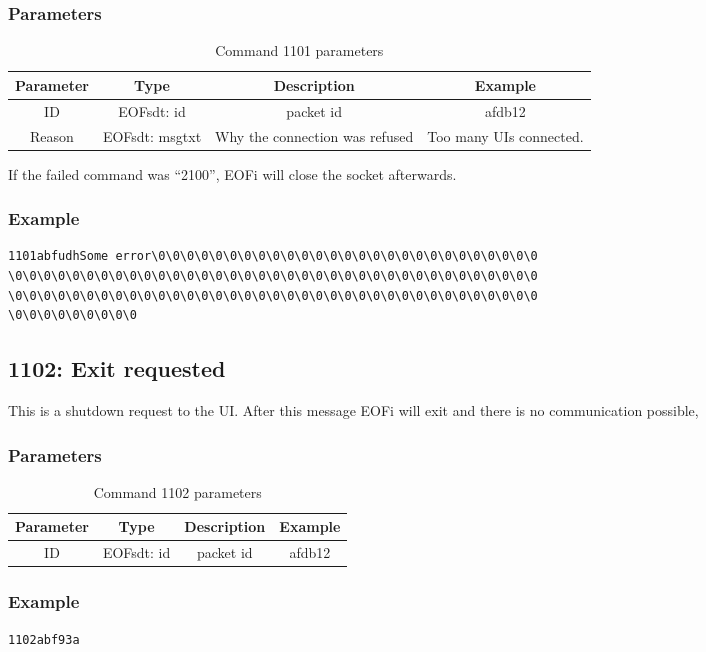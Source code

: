 \documentclass[12pt,a4paper]{book}
\begin{document}
\subsubsection{Parameters}
\begin{longtable}{|c|c|c|c|}
\caption{Command 1101 parameters}\\
\hline
\textbf{Parameter} & \textbf{Type} & \textbf{Description} & \textbf{Example}\\
\hline
ID & EOFsdt: id & packet id & afdb12\\
\hline
Reason & EOFsdt: msgtxt & Why the connection was refused & Too many UIs connected.\\
\hline
\end{longtable}
If the failed command was "`2100"', EOFi will close the socket afterwards.
\subsubsection{Example}
\begin{verbatim}
1101abfudhSome error\0\0\0\0\0\0\0\0\0\0\0\0\0\0\0\0\0\0\0\0\0\0\0\0\0\0\0
\0\0\0\0\0\0\0\0\0\0\0\0\0\0\0\0\0\0\0\0\0\0\0\0\0\0\0\0\0\0\0\0\0\0\0\0\0
\0\0\0\0\0\0\0\0\0\0\0\0\0\0\0\0\0\0\0\0\0\0\0\0\0\0\0\0\0\0\0\0\0\0\0\0\0
\0\0\0\0\0\0\0\0\0
\end{verbatim}
\subsection{1102: Exit requested}
This is a  shutdown request to the UI.
After this message EOFi will exit and there is no communication possible,
\subsubsection{Parameters}
\begin{longtable}{|c|c|c|c|}
\caption{Command 1102 parameters}\\
\hline
\textbf{Parameter} & \textbf{Type} & \textbf{Description} & \textbf{Example}\\
\hline
ID & EOFsdt: id & packet id & afdb12\\
\hline
\end{longtable}
\subsubsection{Example}
\begin{verbatim}
1102abf93a
\end{verbatim}
\end{document}

